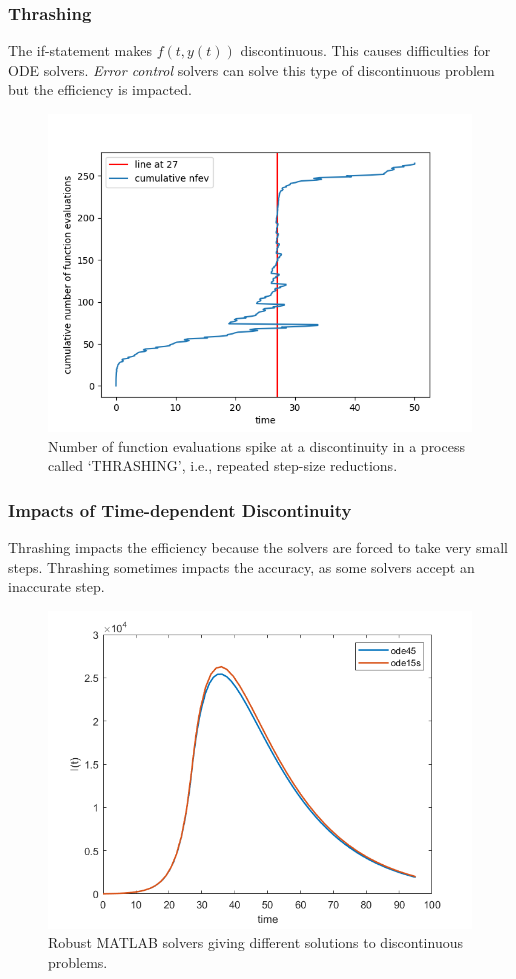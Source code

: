 \documentclass{beamer}
\begin{document}
\begin{frame}
\frametitle{Thrashing}
The if-statement makes $f(t, y(t))$ discontinuous.
This causes difficulties for ODE solvers.
\emph{Error control} solvers can solve this type of discontinuous problem but the efficiency is impacted.
\begin{figure}[H]
\centering
\includegraphics[width=0.7\linewidth]{./figures/ode_thrashing}
\caption{Number of function evaluations spike at a discontinuity in a process called `THRASHING', i.e., repeated step-size reductions.}
\label{fig:ode_thrashing}
\end{figure}
\end{frame}

\begin{frame}
\frametitle{Impacts of Time-dependent Discontinuity}
Thrashing impacts the efficiency because the solvers are forced to take very small steps.
Thrashing sometimes impacts the accuracy, as some solvers accept an inaccurate step.
\begin{figure}[H]
\centering
\includegraphics[width=0.7\linewidth]{./figures/time_discontinuity_matlab}
\caption{Robust MATLAB solvers giving different solutions to discontinuous problems.}
\label{fig:time_discontinuity_matlab}
\end{figure}
\end{frame}
\end{document}
